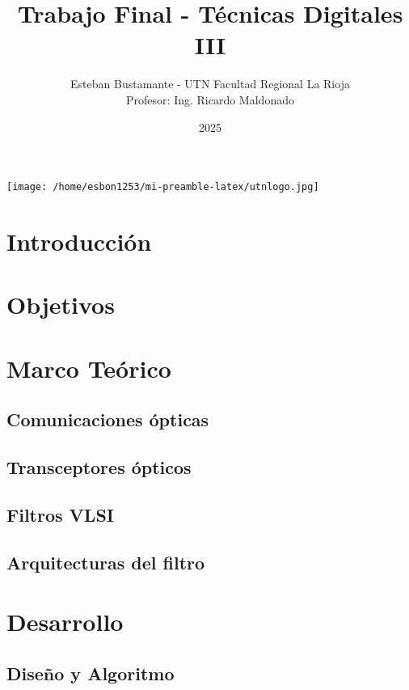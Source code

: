 \documentclass[a4,11pt]{article}
\title{Trabajo Final - Técnicas Digitales III }
\author{Esteban Bustamante - UTN Facultad Regional La Rioja \\ Profesor: Ing. Ricardo Maldonado}
\date{2025}
\begin{document}
\maketitle
\begin{center}
  \texttt{[image: /home/esbon1253/mi-preamble-latex/utnlogo.jpg]}
\end{center}
\pagebreak

\tableofcontents
\pagebreak

\section{Introducción}
\label{sec:introduccion}

\section{Objetivos}
\label{sec:objetivos}

\section{Marco Teórico}
\label{sec:marco-teorico}

\subsection{Comunicaciones ópticas}
\label{sec:comun-optic}

\subsection{Transceptores ópticos}
\label{sec:transc-optic}

\subsection{Filtros VLSI}
\label{sec:filtros-vlsi}

\subsection{Arquitecturas del filtro}
\label{sec:arqu-del-filtro}

\section{Desarrollo}
\label{sec:desarrollo}

\subsection{Diseño y Algoritmo}
\label{sec:diseno-y-algoritmo}
\end{document}
